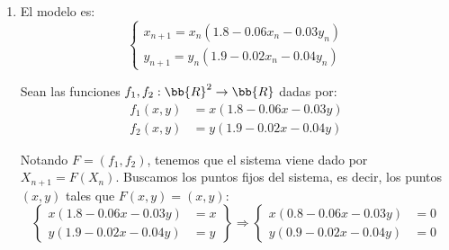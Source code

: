 \begin{ejercicio}
\begin{enumerate}
    \item El modelo es:
    \begin{equation*}
        \begin{cases}
            x_{n+1} = x_n(1.8 - 0.06x_n - 0.03y_n)\\
            y_{n+1} = y_n(1.9 - 0.02x_n - 0.04y_n)
        \end{cases}
    \end{equation*} 

    Sean las funciones $f_1, f_2:\bb{R}^2\to\bb{R}$ dadas por:
    \begin{align*}
        f_1(x,y) &= x(1.8 - 0.06x - 0.03y)\\
        f_2(x,y) &= y(1.9 - 0.02x - 0.04y)
    \end{align*}

    Notando $F=(f_1,f_2)$, tenemos que el sistema viene dado por $X_{n+1} = F(X_n)$.
    Buscamos los puntos fijos del sistema, es decir, los puntos $(x,y)$ tales que $F(x,y) = (x,y)$:
    \begin{equation*}
        \left\{
            \begin{array}{lr}
                x(1.8 - 0.06x - 0.03y) &= x\\
                y(1.9 - 0.02x - 0.04y) &= y
            \end{array}
        \right\}
        \Longrightarrow
        \left\{
            \begin{array}{lr}
                x(0.8 - 0.06x - 0.03y) &=0\\
                y(0.9 - 0.02x - 0.04y) &=0
            \end{array}
        \right.
    \end{equation*}


\end{enumerate}
\end{ejercicio}
